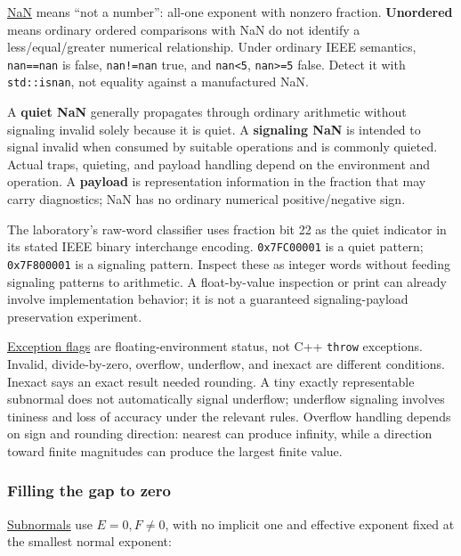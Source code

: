 \hyperref[appendix-d6607cc4c235]{NaN} means ``not a number'': all-one exponent with nonzero fraction. \textbf{Unordered} means ordinary ordered comparisons with NaN do not identify a less/equal/greater numerical relationship. Under ordinary IEEE semantics, \texttt{nan==nan} is false, \texttt{nan!=nan} true, and \texttt{nan\textless{}5}, \texttt{nan\textgreater{}=5} false. Detect it with \texttt{std::isnan}, not equality against a manufactured NaN.

A \textbf{quiet NaN} generally propagates through ordinary arithmetic without signaling invalid solely because it is quiet. A \textbf{signaling NaN} is intended to signal invalid when consumed by suitable operations and is commonly quieted. Actual traps, quieting, and payload handling depend on the environment and operation. A \textbf{payload} is representation information in the fraction that may carry diagnostics; NaN has no ordinary numerical positive/negative sign.

The laboratory's raw-word classifier uses fraction bit 22 as the quiet indicator in its stated IEEE binary interchange encoding. \texttt{0x7FC00001} is a quiet pattern; \texttt{0x7F800001} is a signaling pattern. Inspect these as integer words without feeding signaling patterns to arithmetic. A float-by-value inspection or print can already involve implementation behavior; it is not a guaranteed signaling-payload preservation experiment.

\hyperref[appendix-ed8531b46754]{Exception flags} are floating-environment status, not C++ \texttt{throw} exceptions. Invalid, divide-by-zero, overflow, underflow, and inexact are different conditions. Inexact says an exact result needed rounding. A tiny exactly representable subnormal does not automatically signal underflow; underflow signaling involves tininess and loss of accuracy under the relevant rules. Overflow handling depends on sign and rounding direction: nearest can produce infinity, while a direction toward finite magnitudes can produce the largest finite value.

\subsubsection{Filling the gap to zero}\label{01-foundations-i-ch001-filling-the-gap-to-zero}

\hypertarget{01-foundations-i-ch001-filling-the-gap-to-zero}{}

\hyperref[appendix-00a6e044c437]{Subnormals} use \(E=0,F\ne0\), with no implicit one and effective exponent fixed at the smallest normal exponent:

